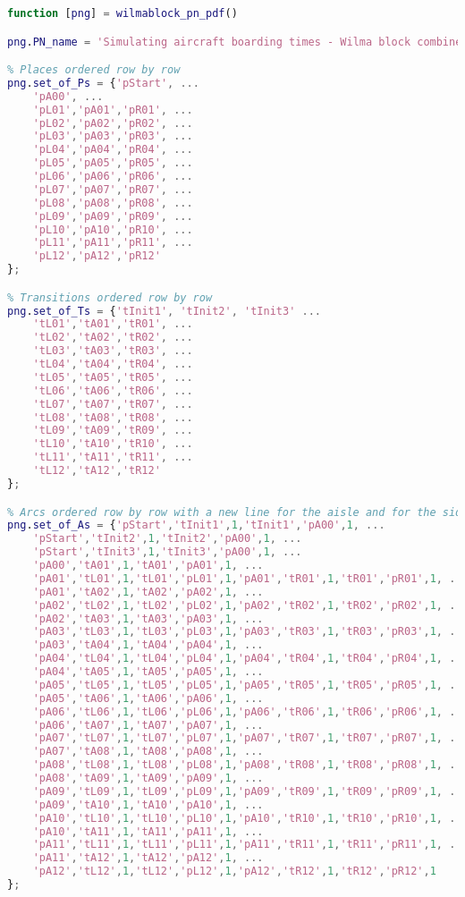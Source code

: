 \begin{lstlisting}[language=MATLAB, caption=wilmablock\_pn\_pdf.m]
function [png] = wilmablock_pn_pdf()

png.PN_name = 'Simulating aircraft boarding times - Wilma block combined method';

% Places ordered row by row
png.set_of_Ps = {'pStart', ...
    'pA00', ...
    'pL01','pA01','pR01', ...
    'pL02','pA02','pR02', ...
    'pL03','pA03','pR03', ...
    'pL04','pA04','pR04', ...
    'pL05','pA05','pR05', ...
    'pL06','pA06','pR06', ...
    'pL07','pA07','pR07', ...
    'pL08','pA08','pR08', ...
    'pL09','pA09','pR09', ...
    'pL10','pA10','pR10', ...
    'pL11','pA11','pR11', ...
    'pL12','pA12','pR12'
};

% Transitions ordered row by row
png.set_of_Ts = {'tInit1', 'tInit2', 'tInit3' ...
    'tL01','tA01','tR01', ...
    'tL02','tA02','tR02', ...
    'tL03','tA03','tR03', ...
    'tL04','tA04','tR04', ...
    'tL05','tA05','tR05', ...
    'tL06','tA06','tR06', ...
    'tL07','tA07','tR07', ...
    'tL08','tA08','tR08', ...
    'tL09','tA09','tR09', ...
    'tL10','tA10','tR10', ...
    'tL11','tA11','tR11', ...
    'tL12','tA12','tR12'
};

% Arcs ordered row by row with a new line for the aisle and for the sides
png.set_of_As = {'pStart','tInit1',1,'tInit1','pA00',1, ...
    'pStart','tInit2',1,'tInit2','pA00',1, ...
    'pStart','tInit3',1,'tInit3','pA00',1, ...
    'pA00','tA01',1,'tA01','pA01',1, ...
    'pA01','tL01',1,'tL01','pL01',1,'pA01','tR01',1,'tR01','pR01',1, ...
    'pA01','tA02',1,'tA02','pA02',1, ...
    'pA02','tL02',1,'tL02','pL02',1,'pA02','tR02',1,'tR02','pR02',1, ...
    'pA02','tA03',1,'tA03','pA03',1, ...
    'pA03','tL03',1,'tL03','pL03',1,'pA03','tR03',1,'tR03','pR03',1, ...
    'pA03','tA04',1,'tA04','pA04',1, ...
    'pA04','tL04',1,'tL04','pL04',1,'pA04','tR04',1,'tR04','pR04',1, ...
    'pA04','tA05',1,'tA05','pA05',1, ...
    'pA05','tL05',1,'tL05','pL05',1,'pA05','tR05',1,'tR05','pR05',1, ...
    'pA05','tA06',1,'tA06','pA06',1, ...
    'pA06','tL06',1,'tL06','pL06',1,'pA06','tR06',1,'tR06','pR06',1, ...
    'pA06','tA07',1,'tA07','pA07',1, ...
    'pA07','tL07',1,'tL07','pL07',1,'pA07','tR07',1,'tR07','pR07',1, ...
    'pA07','tA08',1,'tA08','pA08',1, ...
    'pA08','tL08',1,'tL08','pL08',1,'pA08','tR08',1,'tR08','pR08',1, ...
    'pA08','tA09',1,'tA09','pA09',1, ...
    'pA09','tL09',1,'tL09','pL09',1,'pA09','tR09',1,'tR09','pR09',1, ...
    'pA09','tA10',1,'tA10','pA10',1, ...
    'pA10','tL10',1,'tL10','pL10',1,'pA10','tR10',1,'tR10','pR10',1, ...
    'pA10','tA11',1,'tA11','pA11',1, ...
    'pA11','tL11',1,'tL11','pL11',1,'pA11','tR11',1,'tR11','pR11',1, ...
    'pA11','tA12',1,'tA12','pA12',1, ...
    'pA12','tL12',1,'tL12','pL12',1,'pA12','tR12',1,'tR12','pR12',1
};
\end{lstlisting}